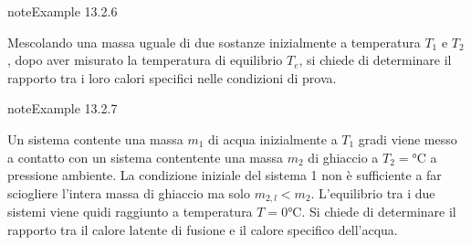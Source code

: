 \documentclass[letterpaper,10pt,italian]{jupyterBook}
\begin{document}
\begin{sphinxadmonition}{note}{Example 13.2.6}



\sphinxAtStartPar
Mescolando una massa uguale di due sostanze inizialmente a temperatura \(T_1\)  e \(T_2\), dopo aver misurato la temperatura di equilibrio \(T_e\), si chiede di determinare il rapporto tra i loro calori specifici nelle condizioni di prova.
\end{sphinxadmonition}
\label{ch/thermodynamics/foundation-experiments:thermodynamics:history:heat-capacity:4}
\begin{sphinxadmonition}{note}{Example 13.2.7}



\sphinxAtStartPar
Un sistema contente una massa \(m_1\) di acqua inizialmente a \(T_1\) gradi viene messo a contatto con un sistema contentente una massa \(m_2\) di ghiaccio a \(T_2 = \text{°C}\) a pressione ambiente. La condizione iniziale del sistema 1 non è sufficiente a far sciogliere l’intera massa di ghiaccio ma solo \(m_{2,l} < m_2\). L’equilibrio tra i due sistemi viene quidi raggiunto a temperatura \(T=0 \text{°C}\). Si chiede di determinare il rapporto tra il calore latente di fusione e il calore specifico dell’acqua.
\end{sphinxadmonition}
\label{ch/thermodynamics/foundation-experiments:thermodynamics:history:heat-capacity:unit}
\end{document}
